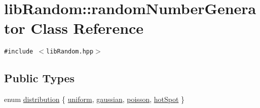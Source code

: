 \hypertarget{classlibRandom_1_1randomNumberGenerator}{
\section{libRandom::randomNumberGenerator Class Reference}
\label{classlibRandom_1_1randomNumberGenerator}
}
{\tt \#include $<$libRandom.hpp$>$}

\subsection*{Public Types}
\begin{CompactItemize}
\item 
enum \hyperlink{classlibRandom_1_1randomNumberGenerator_3bfd56b7b47f4593167e59916a555562}{distribution} \{ \hyperlink{classlibRandom_1_1randomNumberGenerator_3bfd56b7b47f4593167e59916a555562ff9a3f865ed4ada2d51450b598c8f493}{uniform}, 
\hyperlink{classlibRandom_1_1randomNumberGenerator_3bfd56b7b47f4593167e59916a5555629f72ee28c5e162e252084d6e0b1544c8}{gaussian}, 
\hyperlink{classlibRandom_1_1randomNumberGenerator_3bfd56b7b47f4593167e59916a555562c9eda99f85863c727b4f12aaa8d33038}{poisson}, 
\hyperlink{classlibRandom_1_1randomNumberGenerator_3bfd56b7b47f4593167e59916a5555624ed43f9f13bc62ac6ba1caf981dbc90a}{hotSpot}
 \}

\end{CompactItemize}
